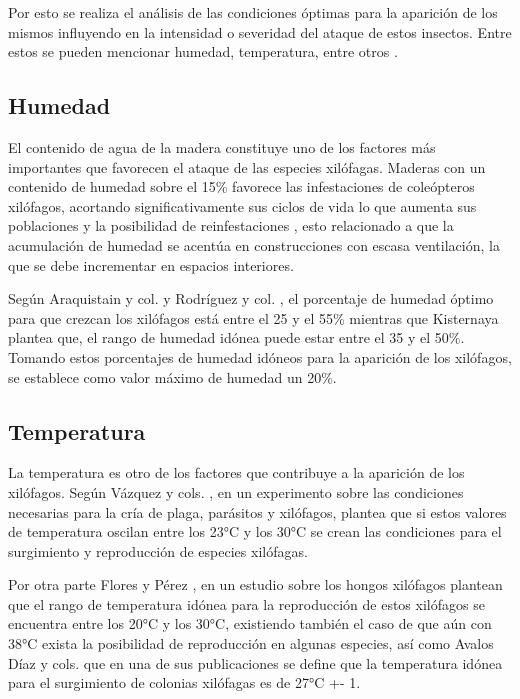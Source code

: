     Por esto se realiza el análisis de las condiciones óptimas para la aparición de los mismos influyendo en la intensidad o severidad del ataque de estos insectos. Entre estos se pueden mencionar humedad, temperatura, entre otros \cite{ripa2004termitas}. 
    
    \subsection{Humedad}

    El contenido de agua de la madera constituye uno de los factores más importantes que favorecen el ataque de las especies xilófagas. Maderas con un contenido de humedad sobre el 15\% favorece las infestaciones de coleópteros xilófagos, acortando significativamente sus ciclos de vida lo que aumenta sus poblaciones y la posibilidad de reinfestaciones \cite{ripa2004termitas}, esto relacionado a que la acumulación de humedad se acentúa en construcciones con escasa ventilación, la que se debe incrementar en espacios interiores.

    Según Araquistain y col. \cite{monitoringMoisture} y Rodríguez y col. \cite{rodriguezcodigo}, el porcentaje de humedad óptimo para que crezcan los xilófagos está entre el 25 y el 55\% mientras que Kisternaya \cite{woodPreservation} plantea que, el rango de humedad idónea puede estar entre el 35 y el 50\%. Tomando estos porcentajes de humedad idóneos para la aparición de los xilófagos, se establece como valor máximo de humedad un 20\%.

    \subsection{Temperatura}

    La temperatura es otro de los factores que contribuye a la aparición de los xilófagos. Según Vázquez y cols. \cite{vazquez1999avetianella}, en un experimento sobre las condiciones necesarias para la cría de plaga, parásitos y xilófagos, plantea que si estos valores de temperatura oscilan entre los 23°C y los 30°C se crean las condiciones para el surgimiento y reproducción de especies xilófagas. 

    Por otra parte Flores y Pérez \cite{floresDurabilidadNaturalDiez1987a}, en un estudio sobre los hongos xilófagos plantean que el rango de temperatura idónea para la reproducción de estos xilófagos se encuentra entre los 20°C y los 30°C, existiendo también el caso de que aún con 38°C exista la posibilidad de reproducción en algunas especies, así como Avalos Díaz y cols. \cite{avalosdiazInfluenciaDosHongos2020} que en una de sus publicaciones se define que la temperatura idónea para el surgimiento de colonias xilófagas es de 27°C +- 1.

